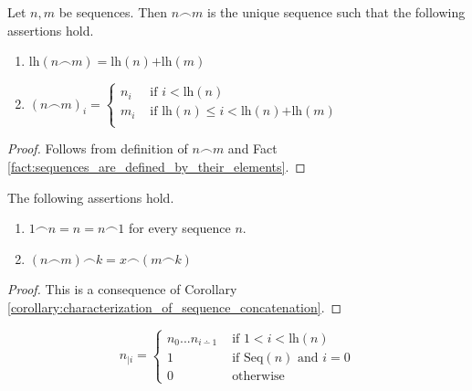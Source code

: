 \documentclass[10pt]{amsart}
\newcommand{\mle}{\boldsymbol{<}}
\newcommand{\mleq}{\boldsymbol{\leq}}
\newcommand{\meq}{\boldsymbol{=}}
\newcommand{\mplus}{\boldsymbol{+}}
\begin{document}
\begin{corollary}\label{corollary:characterization_of_sequence_concatenation}
	Let $n,m$ be sequences. Then $n \frown m$ is the unique sequence such that the following assertions hold.
	\begin{enumerate}[label=\emph{\textbf{(\arabic*)}}, leftmargin=3.0em]
		\item $\mathrm{lh}(n\frown m) \meq \mathrm{lh}(n) \mplus \mathrm{lh}(m)$
		\item $(n \frown m)_i \meq \begin{cases}
				      n_i & \mbox{ if }i \mle \mathrm{lh}(n)                                      \\
				      m_i & \mbox{ if }\mathrm{lh}(n) \mleq i \mle \mathrm{lh}(n) \mplus \mathrm{lh}(m) \\
			      \end{cases}$
	\end{enumerate}
\end{corollary}
\begin{proof}
	Follows from definition of $n \frown m$ and Fact \ref{fact:sequences_are_defined_by_their_elements}.
\end{proof}

\begin{corollary}\label{corollary:properties_of_sequence_concatenation}
	The following assertions hold.
	\begin{enumerate}[label=\emph{\textbf{(\arabic*)}}, leftmargin=3.0em]
		\item $1 \frown n \meq n \meq n \frown 1$ for every sequence $n$.
		\item $(n \frown m) \frown k \meq x\frown (m \frown k)$
	\end{enumerate}
\end{corollary}
\begin{proof}
	This is a consequence of Corollary \ref{corollary:characterization_of_sequence_concatenation}.
\end{proof}

\begin{definition}
  $$n_{\mid i} = \begin{cases}
  n_0...n_{i\dotminus 1}&\mbox{ if }1 < i \mle \mathrm{lh}(n)\\
  1&\mbox{ if }\mathrm{Seq}(n)\mbox{ and }i \meq 0\\
  0&\mbox{ otherwise }
  \end{cases}$$
\end{definition}
\end{document}
